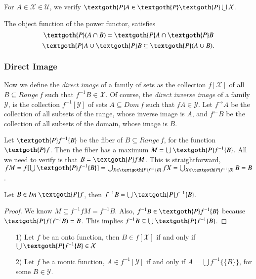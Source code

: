 \documentclass [12pt]{book}
\begin{document}
\begin{proposition}For $A\in\mathcal{X}\in\mathcal{U}$, we verify $\textgoth{P}A\in\textgoth{P}\textgoth{P}\bigcup\mathcal{X}$.\end{proposition}

\begin{proposition}The object function of the power functor, satisfies $$\textgoth{P}(A\cap B)=\textgoth{P}A\cap\textgoth{P}B$$
$$\textgoth{P}A\cup\textgoth{P}B
\subseteq\textgoth{P}(A\cup B).$$
\end{proposition}


		\subsubsection{Direct Image}

Now we define the \textit{direct image} of a family of sets as the collection $f[\mathcal{X}]$ of all $B\subseteq Range~f$ such that $f^{-1}B\in\mathcal{X}$. Of course, the \textit{direct inverse image} of a family $\mathcal{Y}$, is the collection $f^{-1}[\mathcal{Y}]$ of sets $A\subseteq Dom~f$ such that $fA\in\mathcal{Y}$. Let $f^\rightarrow A$ be the collection of all subsets of the range, whose inverse image is $A$, and $f^\leftarrow B$ be the collection of all subsets of the domain, whose image is $B$.

Let $\textgoth{P}f^{-1}\{B\}$ be the fiber of $B\subseteq Range~f$, for the function $\textgoth{P}f$. Then the fiber has a maximum $M=\bigcup\textgoth{P}f^{-1}\{B\}$. All we need to verify is that $B=\textgoth{P}fM$. This is straightforward, $fM=f[\bigcup\textgoth{P}f^{-1}\{B\}]=\bigcup_{X\in\textgoth{P}f^{-1}\{B\}}fX=
\bigcup_{X\in\textgoth{P}f^{-1}\{B\}}B=B$. 

\begin{lemma3.1}Let $B\in Im~\textgoth{P}f$, then $f^{-1}B
=\bigcup\textgoth{P}f^{-1}\{B\}$.\end{lemma3.1}

\begin{proof}We know $M\subseteq f^{-1}fM=f^{-1}B$. Also, $f^{-1}B\in\textgoth{P}f^{-1}\{B\}$ because $\textgoth{P}f(f^{-1}B)=B$. This implies $f^{-1}B\subseteq\bigcup\textgoth{P}f^{-1}\{B\}$.\end{proof}

\begin{lemma3.2}\makebox[5pt][]{}\mbox {}\begin{itemize}\item[1)]Let $f$ be an onto function, then $B\in f[\mathcal{X}]$ if and only if $\bigcup\textgoth{P}f^{-1}\{B\}\in\mathcal{X}$\item[2)]Let $f$ be a monic function, $A\in f^{-1}[\mathcal{Y}]$ if and only if $A=\bigcup f^{-1}\{\{B\}\}$, for some $B\in\mathcal{Y}$.\end{itemize}\label{lemma3.2}\end{lemma3.2}
\end{document}

